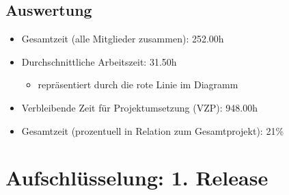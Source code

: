 \documentclass[11pt,a4paper]{report}
\begin{document}
\subsection{Auswertung}

\begin{itemize}
\item Gesamtzeit (alle Mitglieder zusammen): 252.00h
\item Durchschnittliche Arbeitszeit: 31.50h
	\begin{itemize}
	\item repräsentiert durch die rote Linie im Diagramm
	\end{itemize}
\item Verbleibende Zeit für Projektumsetzung (VZP): 948.00h
\item Gesamtzeit (prozentuell in Relation zum Gesamtprojekt): 21\%
\end{itemize}

\newpage

\section{Aufschlüsselung: 1. Release}

\end{document}
